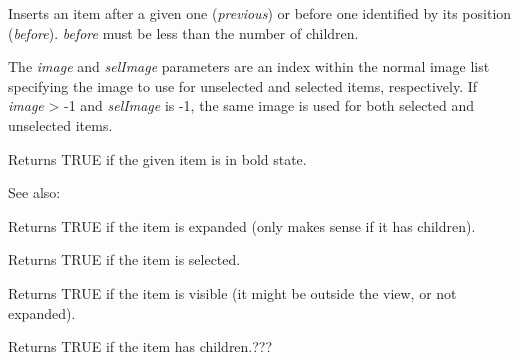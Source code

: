 
Inserts an item after a given one ({\it previous}) or before one identified by its position ({\it before}).
{\it before} must be less than the number of children.

The {\it image} and {\it selImage} parameters are an index within
the normal image list specifying the image to use for unselected and
selected items, respectively.
If {\it image} > -1 and {\it selImage} is -1, the same image is used for
both selected and unselected items.


\label{wxtreelistctrlisbold}


Returns TRUE if the given item is in bold state.

See also: 

\label{wxtreelistctrlisexpanded}


Returns TRUE if the item is expanded (only makes sense if it has children).

\label{wxtreelistctrlisselected}


Returns TRUE if the item is selected.

\label{wxtreelistctrlisvisible}


Returns TRUE if the item is visible (it might be outside the view, or not expanded).

\label{wxtreelistctrlhaschildren}


Returns TRUE if the item has children.???

